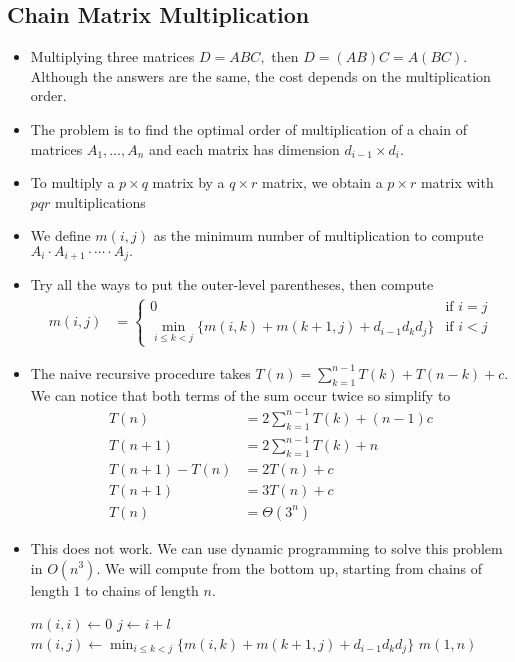 \documentclass[a4paper,12pt]{article}
\begin{document}
\subsection{Chain Matrix Multiplication}
\begin{itemize}
    \item Multiplying three matrices $D=ABC,$ then $D=(AB)C=A(BC).$ Although the answers are the same, the cost depends on the multiplication order.
    \item The problem is to find the optimal order of multiplication of a chain of matrices $A_1,\dots,A_n$ and each matrix has dimension $d_{i-1}\times d_i.$
    \item To multiply a $p\times q$ matrix by a $q\times r$ matrix, we obtain a $p\times r$ matrix with $pqr$ multiplications
    \item We define $m(i,j)$ as the minimum number of multiplication to compute $A_i\cdot A_{i+1}\cdot\cdots\cdot A_j.$
    \item Try all the ways to put the outer-level parentheses, then compute \begin{align}
        m(i,j)&=\begin{cases}
            0&\text{if $i=j$}\\
            \min_{i\leq k<j}\{m(i,k)+m(k+1,j)+d_{i-1}d_kd_j\}&\text{if $i<j$}
        \end{cases}
    \end{align}
    \item The naive recursive procedure takes $T(n)=\sum_{k=1}^{n-1}T(k)+T(n-k)+c.$ We can notice that both terms of the sum occur twice so simplify to \begin{align}
        T(n)&=2\sum_{k=1}^{n-1}T(k)+(n-1)c\\
        T(n+1)&=2\sum_{k=1}^{n-1}T(k)+n\\
        T(n+1)-T(n)&=2T(n)+c\\
        T(n+1)&=3T(n)+c\\
        T(n)&=\Theta(3^n)
    \end{align}
    \item This does not work. We can use dynamic programming to solve this problem in $O(n^3).$ We will compute from the bottom up, starting from chains of length $1$ to chains of length $n.$ \begin{algorithmic}[1]
            \State $m(i,i)\gets 0$
        \EndFor
                \State $j\gets i+l$
                \State $m(i,j)\gets\min_{i\leq k<j}\{m(i,k)+m(k+1,j)+d_{i-1}d_kd_j\}$
            \EndFor
        \EndFor
        \State \Return $m(1,n)$
        \EndProcedure
    \end{algorithmic}
\end{itemize}
\end{document}

